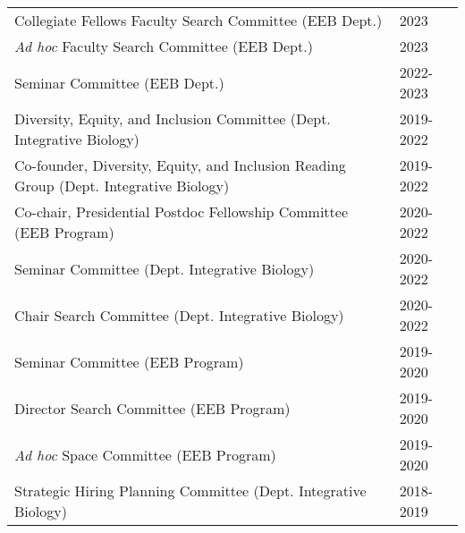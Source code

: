 \documentclass{article}
\begin{document}
\begin{longtable}{>{\everypar{\dohang}\dohang\raggedright\arraybackslash}p{}p{}}
%
Collegiate Fellows Faculty Search Committee (EEB Dept.) & \hfill 2023\\
%
\emph{Ad hoc} Faculty Search Committee (EEB Dept.) & \hfill 2023\\
%
Seminar Committee (EEB Dept.)  & \hfill 2022-2023\\
%
Diversity, Equity, and Inclusion Committee (Dept. Integrative Biology) & \hfill 2019-2022\\
%
Co-founder, Diversity, Equity, and Inclusion Reading Group (Dept. Integrative Biology) & \hfill 2019-2022\\
%
Co-chair, Presidential Postdoc Fellowship Committee (EEB Program) & \hfill 2020-2022\\
%
Seminar Committee (Dept. Integrative Biology) & \hfill 2020-2022\\
%
Chair Search Committee (Dept. Integrative Biology) & \hfill 2020-2022\\
%
Seminar Committee (EEB Program) & \hfill 2019-2020\\
%
Director Search Committee (EEB Program) & \hfill 2019-2020\\
%
\emph{Ad hoc} Space Committee (EEB Program) & \hfill 2019-2020\\
%
Strategic Hiring Planning Committee (Dept. Integrative Biology) & \hfill 2018-2019\\
%
%
%
%
%
%
%
\end{longtable}
%
%
\end{document}
